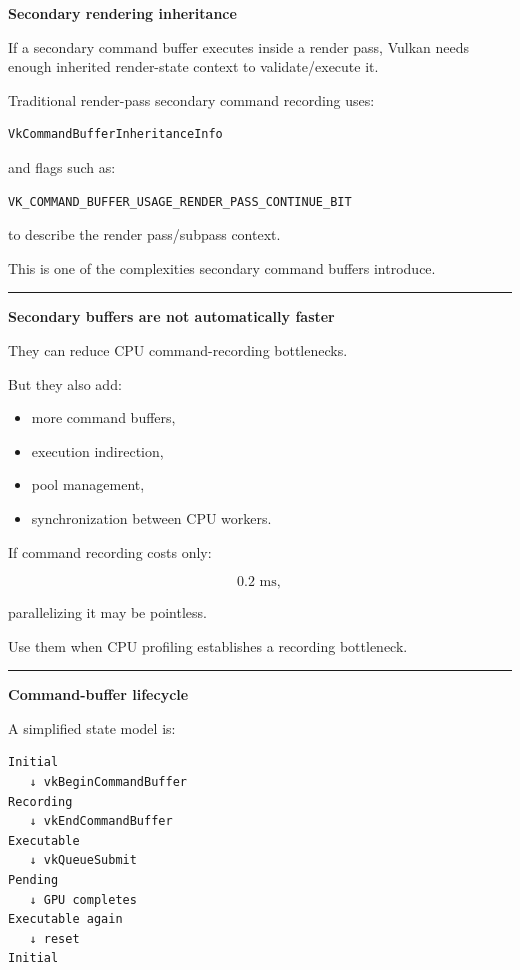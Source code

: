 \textbf{Secondary rendering inheritance}

If a secondary command buffer executes inside a render pass, Vulkan needs enough inherited render-state context to validate/execute it.

Traditional render-pass secondary command recording uses:

\begin{verbatim}
VkCommandBufferInheritanceInfo
\end{verbatim}

and flags such as:

\begin{verbatim}
VK_COMMAND_BUFFER_USAGE_RENDER_PASS_CONTINUE_BIT
\end{verbatim}

to describe the render pass/subpass context.

This is one of the complexities secondary command buffers introduce.

\begin{center}\rule{0.5\linewidth}{0.5pt}\end{center}

\textbf{Secondary buffers are not automatically faster}

They can reduce CPU command-recording bottlenecks.

But they also add:

\begin{itemize}
\tightlist
\item
  more command buffers,
\item
  execution indirection,
\item
  pool management,
\item
  synchronization between CPU workers.
\end{itemize}

If command recording costs only:

\[
0.2\text{ ms},
\]

parallelizing it may be pointless.

Use them when CPU profiling establishes a recording bottleneck.

\begin{center}\rule{0.5\linewidth}{0.5pt}\end{center}

\textbf{Command-buffer lifecycle}

A simplified state model is:

\begin{verbatim}
Initial
   ↓ vkBeginCommandBuffer
Recording
   ↓ vkEndCommandBuffer
Executable
   ↓ vkQueueSubmit
Pending
   ↓ GPU completes
Executable again
   ↓ reset
Initial
\end{verbatim}

